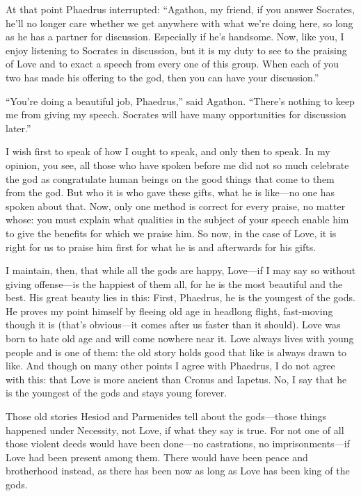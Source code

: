 At that point Phaedrus interrupted: “Agathon, my friend, if you answer
Socrates, he'll no longer care whether we get anywhere with what we're
doing here, so long as he has a partner for discussion. Especially if
he's handsome. Now, like you, I enjoy listening to Socrates in
discussion, but it is my duty to see to the praising of Love and to
exact a speech from every one of this group. When each of you two has
made his offering to the god, then you can have your discussion.”

“You're doing a beautiful job, Phaedrus,” said Agathon. “There's nothing
to keep me from giving my speech. Socrates will have many opportunities
for discussion later.”

\blank[line]

I wish first to speak of how I ought to speak, and only then to speak.
In my opinion, you see, all those who have spoken before me did not so
much celebrate the god as congratulate human beings on the good things
that come to them from the god. But who it is who gave these gifts, what
he is like---no one has spoken about that. Now, only one method is
correct  for every praise, no matter whose: you must
explain what qualities in the subject of your speech enable him to give
the benefits for which we praise him. So now, in the case of Love, it is
right for us to praise him first for what he is and afterwards for his
gifts.

I maintain, then, that while all the gods are happy, Love---if I may say
so without giving offense---is the happiest of them all, for he is the
most beautiful and the best. His great beauty lies in this: First,
Phaedrus, he is  the youngest of the
gods. He proves my
point himself by fleeing old age in headlong flight, fast-moving though
it is (that's obvious---it comes after us faster than it should). Love
was born to hate old age and will come nowhere near it. Love always
lives with young people and is one of them: the old story holds good
that like is always drawn to like. And though on many other points I
agree with Phaedrus, I do not agree with this: that  Love is more
ancient than Cronus and Iapetus. No, I say that he is the youngest of
the gods and stays young forever.

Those old stories Hesiod and Parmenides tell about the gods---those
things happened under Necessity, not Love, if what they say is true. For
not one of all those violent deeds would have been done---no
castrations, no imprisonments---if Love had been present among them.
There would have been peace and brotherhood instead, as there has been
now as long as Love has been king of the gods.

